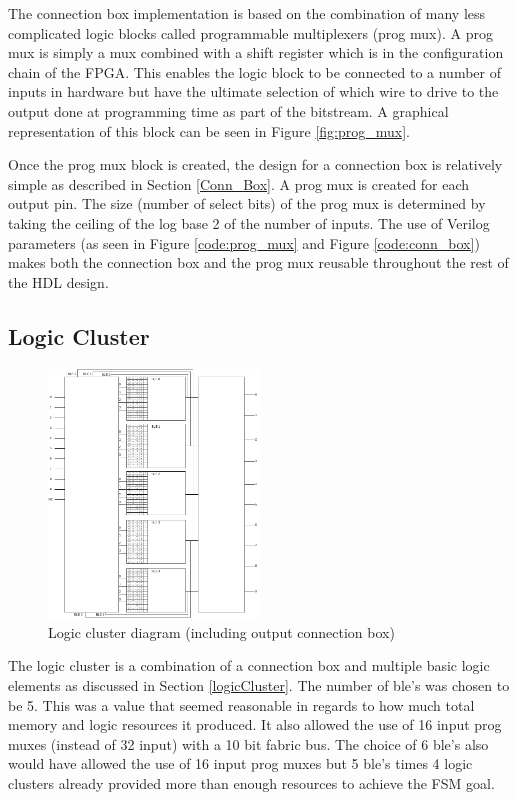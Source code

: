 \documentclass[12pt]{article}
\begin{document}
The connection box implementation is based on the combination of many less complicated
logic blocks called programmable multiplexers (prog mux). A prog mux is simply a mux combined with
a shift register which is in the configuration chain of the FPGA. This enables the logic
block to be connected to a number of inputs in hardware but have the ultimate selection
of which wire to drive to the output done at programming time as part of the bitstream. 
A graphical representation of this block can be seen in Figure \ref{fig:prog_mux}.

Once the prog mux block is created, the design for a connection box is relatively simple
as described in Section \ref{Conn_Box}. A prog mux is created for each output pin. The
size (number of select bits) of the prog mux is determined by taking the ceiling of
the log base 2 of the number of inputs.
The use of Verilog parameters (as seen in Figure \ref{code:prog_mux} and Figure \ref{code:conn_box})
makes both the connection box and the prog mux reusable
throughout the rest of the HDL design.

\subsection{Logic Cluster}

\begin{figure}[ht]
    \centering
    \includegraphics[width=0.5\textwidth]{LogicCluster}
    \caption{Logic cluster diagram (including output connection box)}
    \label{fig:logic_cluster}
\end{figure}

The logic cluster is a combination of a connection box and multiple basic logic elements
as discussed in Section \ref{logicCluster}. The number of ble's was chosen to be 5. This
was a value that seemed reasonable in regards to how much total memory and logic resources
 it produced. It also allowed the use of 16 input prog muxes (instead of 32 input) with a
10 bit fabric bus. The choice of 6 ble's also would have allowed the use of 16 input prog muxes but
5 ble's times 4 logic clusters already provided more than enough resources to achieve the
FSM goal.
\end{document}
